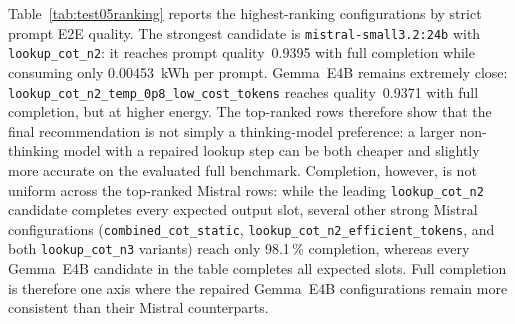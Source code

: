 Table~\ref{tab:test05ranking} reports the highest-ranking configurations by
strict prompt E2E quality. The strongest candidate is
\texttt{mistral-small3.2:24b} with \texttt{lookup\_cot\_n2}: it reaches
prompt quality~0.9395 with full completion while consuming only
0.00453~kWh per prompt. Gemma~E4B remains extremely close:
\texttt{lookup\_cot\_n2\_\allowbreak temp\_0p8\_\allowbreak low\_cost\_tokens} reaches
quality~0.9371 with full completion, but at higher energy. The top-ranked
rows therefore show that the final recommendation is not simply a
thinking-model preference: a larger non-thinking model with a repaired lookup
step can be both cheaper and slightly more accurate on the evaluated full
benchmark. Completion, however, is not uniform across the top-ranked Mistral
rows: while the leading \texttt{lookup\_cot\_n2} candidate completes every
expected output slot, several other strong Mistral configurations
(\texttt{combined\_cot\_static}, \texttt{lookup\_cot\_n2\_efficient\_tokens},
and both \texttt{lookup\_cot\_n3} variants) reach only 98.1\,\% completion,
whereas every Gemma~E4B candidate in the table completes all expected slots.
Full completion is therefore one axis where the repaired Gemma~E4B
configurations remain more consistent than their Mistral counterparts.

